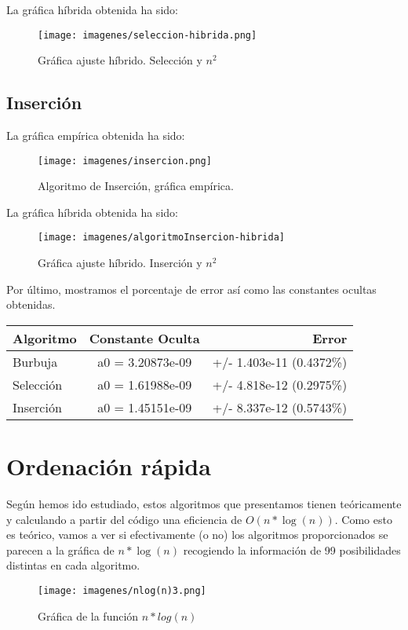 \documentclass[a4paper, 11pt]{article} %
\begin{document}
	
	La gráfica híbrida obtenida ha sido:
	\begin{figure}[htb]
		\centering
		\texttt{[image: imagenes/seleccion-hibrida.png]}
		\caption{Gráfica ajuste híbrido. Selección y $n^2$}
		\label{fig:E5}
	\end{figure}
	

\subsection{Inserción}

La gráfica empírica obtenida ha sido:
\begin{figure}[htb]
	\centering
	\texttt{[image: imagenes/insercion.png]}
	\caption{Algoritmo de Inserción, gráfica empírica.}
	\label{fig:E6}
\end{figure}
	

La gráfica híbrida obtenida ha sido:
\begin{figure}[htb]
	\centering
	\texttt{[image: imagenes/algoritmoInsercion-hibrida]}
	\caption{Gráfica ajuste híbrido. Inserción y $n^2$}
	\label{fig:E7}
\end{figure}
Por último, mostramos el porcentaje de error así como las constantes ocultas obtenidas.\\
\begin{center}
	\begin{tabular}{| l | c | r |}
		\hline
		\textbf{Algoritmo} & \textbf{Constante Oculta} & \textbf{Error} \\
		\hline
		Burbuja & a0 = 3.20873e-09 & +/- 1.403e-11 (0.4372\%)\\ \hline
		Selección & a0 = 1.61988e-09 & +/- 4.818e-12 (0.2975\%) \\ \hline		
		Inserción & a0 = 1.45151e-09 &  +/- 8.337e-12    (0.5743\%) \\ \hline
	\end{tabular}
\end{center}
	
	
\section{Ordenación rápida} %
Según hemos ido estudiado, estos algoritmos que presentamos tienen teóricamente y calculando a partir del código una eficiencia de $O(n*\log(n) )$. Como esto es teórico, vamos a ver si efectivamente (o no) los algoritmos proporcionados se parecen a la gráfica de $n*\log(n)$ recogiendo la información de 99 posibilidades distintas en cada algoritmo.
\begin{figure}[htb]
	\centering
	\texttt{[image: imagenes/nlog(n)3.png]}
	\caption{Gráfica de la función $n*log(n)$}
	\label{fig:E8}
\end{figure}
\end{document}
